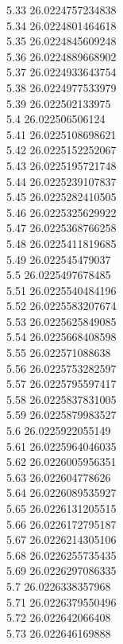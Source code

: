 {5.33	26.0224757234838\\
5.34	26.0224801464618\\
5.35	26.0224845609248\\
5.36	26.0224889668902\\
5.37	26.0224933643754\\
5.38	26.0224977533979\\
5.39	26.022502133975\\
5.4	26.022506506124\\
5.41	26.0225108698621\\
5.42	26.0225152252067\\
5.43	26.0225195721748\\
5.44	26.0225239107837\\
5.45	26.0225282410505\\
5.46	26.0225325629922\\
5.47	26.0225368766258\\
5.48	26.0225411819685\\
5.49	26.022545479037\\
5.5	26.0225497678485\\
5.51	26.0225540484196\\
5.52	26.0225583207674\\
5.53	26.0225625849085\\
5.54	26.0225668408598\\
5.55	26.022571088638\\
5.56	26.0225753282597\\
5.57	26.0225795597417\\
5.58	26.0225837831005\\
5.59	26.0225879983527\\
5.6	26.0225922055149\\
5.61	26.0225964046035\\
5.62	26.0226005956351\\
5.63	26.022604778626\\
5.64	26.0226089535927\\
5.65	26.0226131205515\\
5.66	26.0226172795187\\
5.67	26.0226214305106\\
5.68	26.0226255735435\\
5.69	26.0226297086335\\
5.7	26.0226338357968\\
5.71	26.0226379550496\\
5.72	26.022642066408\\
5.73	26.022646169888\\
}
